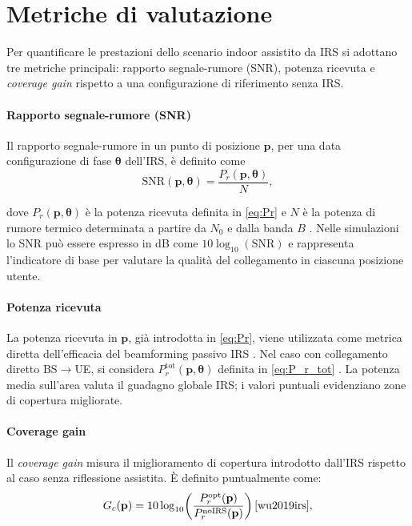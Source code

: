 \documentclass[12pt,a4paper]{report}
\begin{document}
\section{Metriche di valutazione}
Per quantificare le prestazioni dello scenario indoor assistito da
IRS si adottano tre metriche principali: rapporto segnale-rumore
(SNR), potenza ricevuta e \textit{coverage gain} rispetto a una
configurazione di riferimento senza IRS.

\paragraph{Rapporto segnale-rumore (SNR)}
Il rapporto segnale-rumore in un punto di posizione $\mathbf{p}$, per
una data configurazione di fase $\boldsymbol{\theta}$ dell'IRS, è definito come
\begin{equation}
  \mathrm{SNR}(\mathbf{p}, \boldsymbol{\theta}) =
  \frac{P_r(\mathbf{p}, \boldsymbol{\theta})}{N},
  \label{eq:snr}
\end{equation}

dove $P_r(\mathbf{p}, \boldsymbol{\theta})$ è la potenza ricevuta
definita in \eqref{eq:Pr} e $N$ è la potenza di rumore termico
determinata a partire da $N_0$ e dalla banda $B$ \cite{3gpp_tr38901}.
Nelle simulazioni lo SNR può essere espresso in dB come
$10\log_{10}(\mathrm{SNR})$ e rappresenta l'indicatore di base per
valutare la qualità del collegamento in ciascuna posizione utente.

\paragraph{Potenza ricevuta}
La potenza ricevuta in $\mathbf{p}$, già introdotta in \eqref{eq:Pr},
viene utilizzata come metrica diretta dell'efficacia del beamforming
passivo IRS \cite{wu2019irs}. Nel caso con collegamento diretto
BS$\rightarrow$UE, si considera $P_r^{\text{tot}}(\mathbf{p},
\boldsymbol{\theta})$ definita in \eqref{eq:P_r_tot}
\cite{guo2021cascaded}. La potenza media sull'area valuta il guadagno
globale IRS; i valori puntuali evidenziano zone di copertura migliorate.

\paragraph{Coverage gain}
Il \textit{coverage gain} misura il miglioramento di copertura
introdotto dall'IRS rispetto al caso senza riflessione assistita. È
definito puntualmente come:
\begin{equation}
  G_c(\mathbf{p}) =
  10\log_{10}\!\left(
    \frac{P_r^{\mathrm{opt}}(\mathbf{p})}{P_r^{\mathrm{noIRS}}(\mathbf{p})}
  \right) \cite{wu2019irs},
  \label{eq:coverage_gain}
\end{equation}
\end{document}
